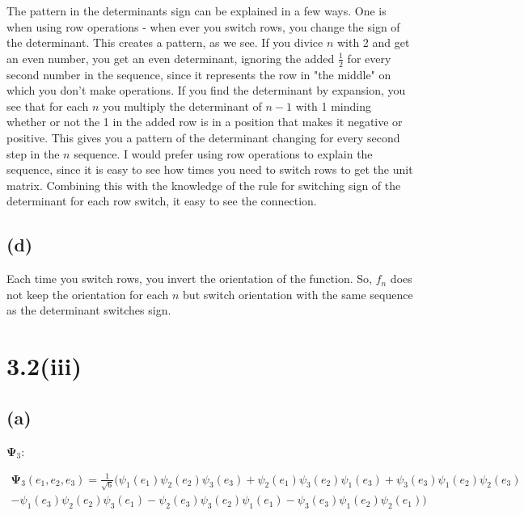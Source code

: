 \documentclass[11pt]{article}
\begin{document}
The pattern in the determinants sign can be explained in a few ways.
One is when using row operations - when ever you switch rows, you change the sign of the determinant.
This creates a pattern, as we see. If you divice \(n\) with 2 and get an even number, you get an even determinant, ignoring the added \(\frac{1}{2}\) for every second number in the sequence, since it represents the row in "the middle" on which you don't make operations.
If you find the determinant by expansion, you see that for each \(n\) you multiply the determinant of \(n-1\) with 1 minding whether or not the 1 in the added row is in a position that makes it negative or positive.
This gives you a pattern of the determinant changing for every second step in the \(n\) sequence.
\newline
I would prefer using row operations to explain the sequence, since it is easy to see how times you need to switch rows to get the unit matrix.
Combining this with the knowledge of the rule for switching sign of the determinant for each row switch, it easy to see the connection.

\subsection{(d)}

Each time you switch rows, you invert the orientation of the function.
So, \(f_n\) does not keep the orientation for each \(n\) but switch orientation with the same sequence as the determinant switches sign.

\section{3.2(iii)}

\subsection{(a)}

\( \bm{\Psi}_3 \):

\begin{equation}
  \begin{split}
    \bm{\Psi}_3(e_1,e_2,e_3) = \frac{1}{\sqrt{6}} ( \psi_1(e_1) \psi_2(e_2) \psi_3(e_3) + \psi_2(e_1) \psi_3(e_2) \psi_1(e_3) + \psi_3(e_3) \psi_1(e_2) \psi_2(e_3) \\
    - \psi_1(e_3) \psi_2(e_2) \psi_3(e_1) - \psi_2(e_3) \psi_3(e_2) \psi_1(e_1) - \psi_3(e_3) \psi_1(e_2) \psi_2(e_1) )
  \end{split}
\end{equation}
\end{document}
